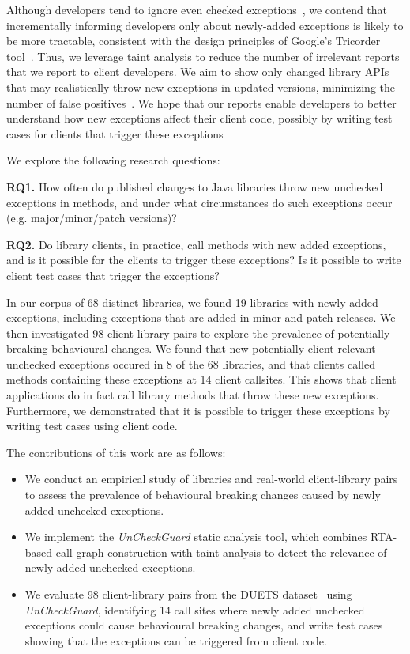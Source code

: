 Although developers tend to ignore even checked
exceptions~\cite{nakshatri16:_analy_java}, we contend that incrementally informing
developers only about newly-added exceptions is likely to be more tractable, consistent with the
design principles of Google's Tricorder tool~\cite{sadowski15:_tricor}.
Thus, we leverage taint analysis
to reduce the number of irrelevant reports that we report to client developers.
We aim to show only changed library APIs that may realistically throw new exceptions
in updated versions, minimizing the number of false positives~\cite{pashchenko20:_vuln4,pashchenko18:_vulner}.
We hope that our reports enable developers to better understand how new exceptions affect their client code,
possibly by writing test cases for clients that trigger these exceptions 

We explore the following research questions:

\noindent
{\bf RQ1.} How often do published changes to Java libraries throw new unchecked exceptions in methods,
and under what circumstances do such exceptions occur (e.g. major/minor/patch versions)?

\noindent
{\bf RQ2.} Do library clients, in practice, call methods with new added exceptions, and is it possible for the clients to trigger these exceptions? Is it possible to write client test cases that trigger the exceptions?

In our corpus of 68 distinct libraries, we found 19 libraries with newly-added exceptions, including exceptions that are added in minor and patch releases.
We then investigated 98 client-library pairs to explore the prevalence of potentially breaking behavioural changes.
We found that new potentially client-relevant unchecked exceptions occured in 8 of the 68 libraries, and that clients called methods containing these exceptions at 14 client callsites.
This shows that client applications do in fact call library methods that throw these new exceptions.
Furthermore, we demonstrated that it is possible to trigger these exceptions by writing test cases using client code.

The contributions of this work are as follows:

\begin{itemize}[noitemsep]
\item We conduct an empirical study of libraries and real-world client-library pairs to assess the prevalence of behavioural breaking changes caused by newly added unchecked exceptions.
\item We implement the \textit{UnCheckGuard} static analysis tool, which combines RTA-based call graph construction with taint analysis to detect the relevance of newly added unchecked exceptions.
\item We evaluate 98 client-library pairs from the DUETS dataset~\cite{durieux21:_duets} using \textit{UnCheckGuard}, identifying 14 call sites where newly added unchecked exceptions could cause behavioural breaking changes, and write test cases showing that the exceptions can be triggered from client code.
\end{itemize}


